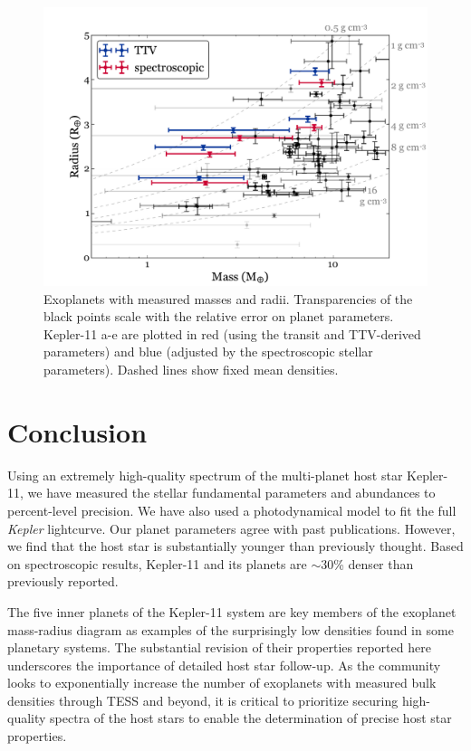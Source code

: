 \documentclass[oneside]{emulateapj}
\begin{document}
\begin{figure}
\centering
\includegraphics[scale=0.6]{K11_massradius}
\caption{Exoplanets with measured masses and radii. Transparencies of the black points scale with the relative error on planet parameters. Kepler-11 a-e are plotted in red (using the transit and TTV-derived parameters) and blue (adjusted by the spectroscopic stellar parameters). Dashed lines show fixed mean densities.}
\label{fig:mr}
\end{figure}


\section{Conclusion}

Using an extremely high-quality spectrum of the multi-planet host star Kepler-11, we have measured the stellar fundamental parameters and abundances to percent-level precision. We have also used a photodynamical model to fit the full \textit{Kepler} lightcurve. Our planet parameters agree with past publications. However, we find that the host star is substantially younger than previously thought. Based on spectroscopic results, Kepler-11 and its planets are $\sim$30\% denser than previously reported.

The five inner planets of the Kepler-11 system are key members of the exoplanet mass-radius diagram as examples of the surprisingly low densities found in some planetary systems. The substantial revision of their properties reported here underscores the importance of detailed host star follow-up. As the community looks to exponentially increase the number of exoplanets with measured bulk densities through TESS and beyond, it is critical to prioritize securing high-quality spectra of the host stars to enable the determination of precise host star properties.
\end{document}
